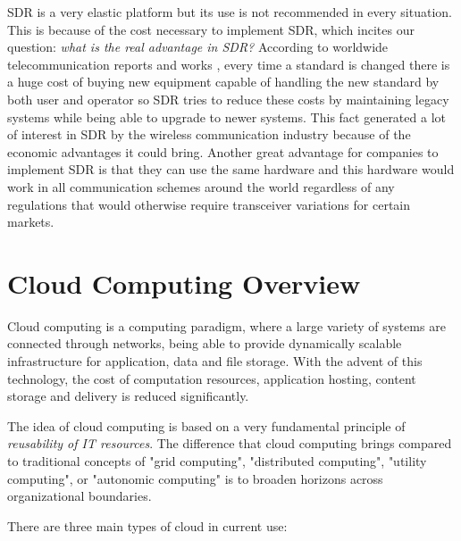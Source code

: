 SDR is a very elastic platform but its use is not recommended in every
situation. This is because of the cost necessary to implement SDR, which incites
our question: \emph{what is the real advantage in SDR?} According to worldwide
telecommunication reports and works \cite{introlte}, every time a standard is
changed there is a huge cost of buying new equipment capable of handling the new
standard by both user and operator so SDR tries to reduce these costs by
maintaining legacy systems while being able to upgrade to newer
systems\cite{dayananda2012}. This fact generated a lot of interest in SDR by the
wireless communication industry because of the economic advantages it could
bring. Another great advantage for companies to implement SDR is that they can
use the same hardware and this hardware would work in all communication schemes
around the world regardless of any regulations that would otherwise require
transceiver variations for certain markets.


\section{Cloud Computing Overview}
\label{sec:sdr_cloud}

Cloud computing is a computing paradigm, where a large variety of systems are
connected through networks, being able to provide dynamically scalable
infrastructure for application, data and file storage. With the advent of this
technology, the cost of computation resources, application hosting, content
storage and delivery is reduced significantly.


The idea of cloud computing is based on a very fundamental principle of
\emph{reusability of IT resources}. The difference that cloud computing brings
compared to traditional concepts of "grid computing", "distributed computing",
"utility computing", or "autonomic computing" is to broaden horizons across
organizational boundaries.

There are three main types of cloud in current use:

